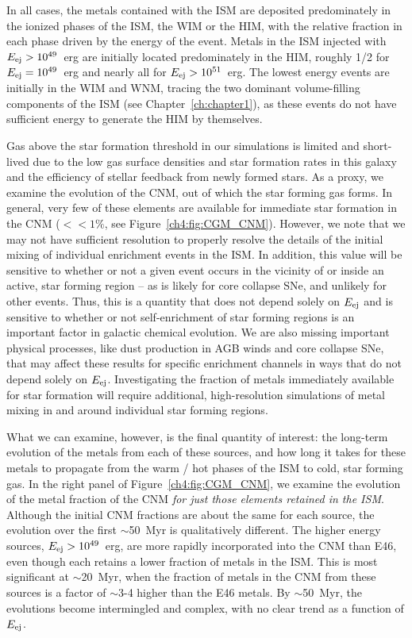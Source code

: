 In all cases, the metals contained with the ISM are deposited predominately in the ionized phases of the ISM, the WIM or the HIM, with the relative fraction in each phase driven by the energy of the event. Metals in the ISM injected with $E_{\rm ej} > 10^{49}$~erg are initially located predominately in the HIM, roughly 1/2 for $E_{\rm ej} = 10^{49}$~erg and nearly all for $E_{\rm ej} > 10^{51}$~erg. The lowest energy events are initially in the WIM and WNM, tracing the two dominant volume-filling components of the ISM (see Chapter~\ref{ch:chapter1}), as these events do not have sufficient energy to generate the HIM by themselves.

Gas above the star formation threshold in our simulations is limited and short-lived due to the low gas surface densities and star formation rates in this galaxy and the efficiency of stellar feedback from newly formed stars. As a proxy, we examine the evolution of the CNM, out of which the star forming gas forms. In general, very few of these elements are available for immediate star formation in the CNM ($<< 1\%$, see Figure~\ref{ch4:fig:CGM_CNM}). However, we note that we may not have sufficient resolution to properly resolve the details of the initial mixing of individual enrichment events in the ISM. In addition, this value will be sensitive to whether or not a given event occurs in the vicinity of or inside an active, star forming region -- as is likely for core collapse SNe, and unlikely for other events. Thus, this is a quantity that does not depend solely on $E_{\rm ej}$ and is sensitive to whether or not self-enrichment of star forming regions is an important factor in galactic chemical evolution. We are also missing important physical processes, like dust production in AGB winds and core collapse SNe, that may affect these results for specific enrichment channels in ways that do not depend solely on $E_{\rm ej}$. Investigating the fraction of metals immediately available for star formation will require additional, high-resolution simulations of metal mixing in and around individual star forming regions.

What we can examine, however, is the final quantity of interest: the long-term evolution of the metals from each of these sources, and how long it takes for these metals to propagate from the warm / hot phases of the ISM to cold, star forming gas. In the right panel of Figure~\ref{ch4:fig:CGM_CNM}, we examine the evolution of the metal fraction of the CNM \textit{for just those elements retained in the ISM}. Although the initial CNM fractions are about the same for each source, the evolution over the first $\sim$50~Myr is qualitatively different. The higher energy sources, $E_{\rm ej} > 10^{49}$~erg, are more rapidly incorporated into the CNM than E46, even though each retains a lower fraction of metals in the ISM. This is most significant at $\sim$20~Myr, when the fraction of metals in the CNM from these sources is a factor of $\sim$3-4 higher than the E46 metals. By $\sim$50~Myr, the evolutions become intermingled and complex, with no clear trend as a function of $E_{\rm ej}$.

